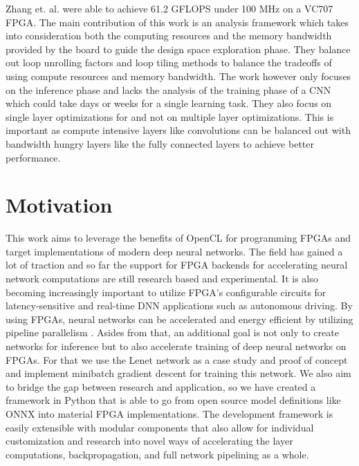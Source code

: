 Zhang et. al.\cite{Zhang2015} were able to achieve 61.2 GFLOPS under 100 MHz on a VC707 FPGA. The main contribution of this work is an analysis framework which takes into consideration both the computing resources and the memory bandwidth provided by the board to guide the design space exploration phase. They balance out loop unrolling factors and loop tiling methods to balance the tradeoffs of using compute resources and memory bandwidth. The work however only focuses on the inference phase and lacks the analysis of the training phase of a CNN which could take days or weeks for a single learning task. They also focus on single layer optimizations for and not on multiple layer optimizations. This is important as compute intensive layers like convolutions can be balanced out with bandwidth hungry layers like the fully connected layers to achieve better performance. 



\section{Motivation}

This work aims to leverage the benefits of OpenCL for programming FPGAs and target implementations of modern deep neural networks. The field has gained a lot of traction and so far the support for FPGA backends for accelerating neural network computations are still research based and experimental. It is also becoming increasingly important to utilize FPGA's configurable circuits for latency-sensitive and real-time DNN applications such as autonomous driving. By using FPGAs, neural networks can be accelerated and energy efficient by utilizing pipeline parallelism \cite{ddl, deepfpga}. Asides from that, an additional goal is not only to create networks for inference but to also accelerate training of deep neural networks on FPGAs. For that we use the Lenet network as a case study and proof of concept and implement minibatch gradient descent for training this network. We also aim to bridge the gap between research and application, so we have created a framework in Python that is able to go from open source model definitions like ONNX \cite{onnx} into material FPGA implementations. The development framework is easily extensible with modular components that also allow for individual customization and research into novel ways of accelerating the layer computations, backpropagation, and full network pipelining as a whole. 


